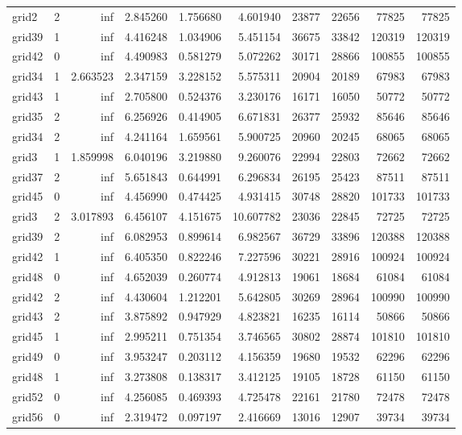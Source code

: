 \begin{longtable}{|l|r|r|r|r|r|r|r|r|r|}
grid2 & 2 & inf & 2.845260 & 1.756680 & 4.601940 & 23877 & 22656 & 77825 & 77825 \\
grid39 & 1 & inf & 4.416248 & 1.034906 & 5.451154 & 36675 & 33842 & 120319 & 120319 \\
grid42 & 0 & inf & 4.490983 & 0.581279 & 5.072262 & 30171 & 28866 & 100855 & 100855 \\
grid34 & 1 & 2.663523 & 2.347159 & 3.228152 & 5.575311 & 20904 & 20189 & 67983 & 67983 \\
grid43 & 1 & inf & 2.705800 & 0.524376 & 3.230176 & 16171 & 16050 & 50772 & 50772 \\
grid35 & 2 & inf & 6.256926 & 0.414905 & 6.671831 & 26377 & 25932 & 85646 & 85646 \\
grid34 & 2 & inf & 4.241164 & 1.659561 & 5.900725 & 20960 & 20245 & 68065 & 68065 \\
grid3 & 1 & 1.859998 & 6.040196 & 3.219880 & 9.260076 & 22994 & 22803 & 72662 & 72662 \\
grid37 & 2 & inf & 5.651843 & 0.644991 & 6.296834 & 26195 & 25423 & 87511 & 87511 \\
grid45 & 0 & inf & 4.456990 & 0.474425 & 4.931415 & 30748 & 28820 & 101733 & 101733 \\
grid3 & 2 & 3.017893 & 6.456107 & 4.151675 & 10.607782 & 23036 & 22845 & 72725 & 72725 \\
grid39 & 2 & inf & 6.082953 & 0.899614 & 6.982567 & 36729 & 33896 & 120388 & 120388 \\
grid42 & 1 & inf & 6.405350 & 0.822246 & 7.227596 & 30221 & 28916 & 100924 & 100924 \\
grid48 & 0 & inf & 4.652039 & 0.260774 & 4.912813 & 19061 & 18684 & 61084 & 61084 \\
grid42 & 2 & inf & 4.430604 & 1.212201 & 5.642805 & 30269 & 28964 & 100990 & 100990 \\
grid43 & 2 & inf & 3.875892 & 0.947929 & 4.823821 & 16235 & 16114 & 50866 & 50866 \\
grid45 & 1 & inf & 2.995211 & 0.751354 & 3.746565 & 30802 & 28874 & 101810 & 101810 \\
grid49 & 0 & inf & 3.953247 & 0.203112 & 4.156359 & 19680 & 19532 & 62296 & 62296 \\
grid48 & 1 & inf & 3.273808 & 0.138317 & 3.412125 & 19105 & 18728 & 61150 & 61150 \\
grid52 & 0 & inf & 4.256085 & 0.469393 & 4.725478 & 22161 & 21780 & 72478 & 72478 \\
grid56 & 0 & inf & 2.319472 & 0.097197 & 2.416669 & 13016 & 12907 & 39734 & 39734 \\

\end{longtable}
